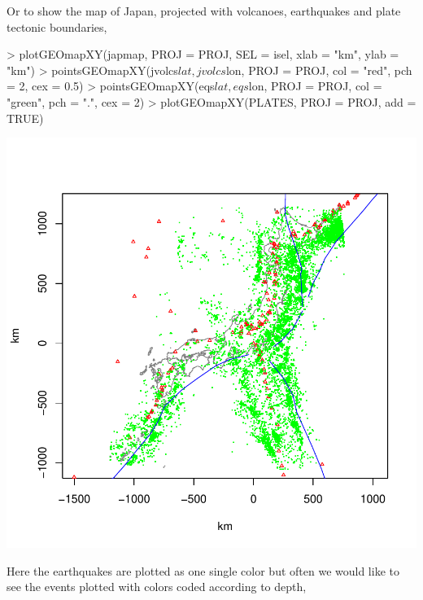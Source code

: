 \documentclass{article}
\begin{document}
Or to show the map of Japan, projected with volcanoes, earthquakes and plate tectonic boundaries, 

\begin{Schunk}
\begin{Sinput}
> plotGEOmapXY(japmap, PROJ = PROJ, SEL = isel, xlab = "km", ylab = "km")
> pointsGEOmapXY(jvolcs$lat, jvolcs$lon, PROJ = PROJ, col = "red", 
     pch = 2, cex = 0.5)
> pointsGEOmapXY(eqs$lat, eqs$lon, PROJ = PROJ, col = "green", 
     pch = ".", cex = 2)
> plotGEOmapXY(PLATES, PROJ = PROJ, add = TRUE)
\end{Sinput}
\end{Schunk}
\includegraphics{gmap-019}

Here the earthquakes are plotted as one single color but often
we would like to see the 
events plotted with colors coded according to 
depth,
\end{document}
